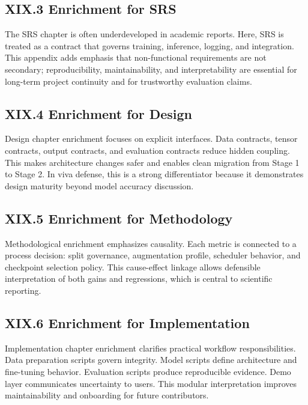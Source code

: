 \subsection*{XIX.3 Enrichment for SRS}
The SRS chapter is often underdeveloped in academic reports. Here, SRS is treated as a contract that governs training, inference, logging, and integration. This appendix adds emphasis that non-functional requirements are not secondary; reproducibility, maintainability, and interpretability are essential for long-term project continuity and for trustworthy evaluation claims.

\subsection*{XIX.4 Enrichment for Design}
Design chapter enrichment focuses on explicit interfaces. Data contracts, tensor contracts, output contracts, and evaluation contracts reduce hidden coupling. This makes architecture changes safer and enables clean migration from Stage 1 to Stage 2. In viva defense, this is a strong differentiator because it demonstrates design maturity beyond model accuracy discussion.

\subsection*{XIX.5 Enrichment for Methodology}
Methodological enrichment emphasizes causality. Each metric is connected to a process decision: split governance, augmentation profile, scheduler behavior, and checkpoint selection policy. This cause-effect linkage allows defensible interpretation of both gains and regressions, which is central to scientific reporting.

\subsection*{XIX.6 Enrichment for Implementation}
Implementation chapter enrichment clarifies practical workflow responsibilities. Data preparation scripts govern integrity. Model scripts define architecture and fine-tuning behavior. Evaluation scripts produce reproducible evidence. Demo layer communicates uncertainty to users. This modular interpretation improves maintainability and onboarding for future contributors.

